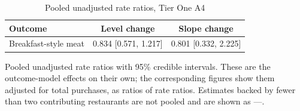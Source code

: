 \begin{table}[H]
\centering
\caption{Pooled unadjusted rate ratios, Tier One A4}
\label{tab:rr_t1_a4}
\begin{tabular}{lcc}
\toprule
Outcome & Level change & Slope change \\
\midrule
Breakfast-style meat & 0.834 [0.571, 1.217] & 0.801 [0.332, 2.225] \\
\bottomrule
\end{tabular}
\par\smallskip\footnotesize Pooled unadjusted rate ratios with 95\% credible intervals. These are the outcome-model effects on their own; the corresponding figures show them adjusted for total purchases, as ratios of rate ratios. Estimates backed by fewer than two contributing restaurants are not pooled and are shown as ---.
\end{table}
